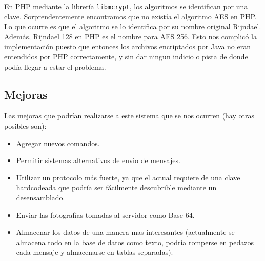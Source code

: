 En PHP mediante la librería \texttt{libmcrypt}, los algoritmos se identifican
por una clave. Sorprendentemente encontramos que no existía el algoritmo AES
en PHP. Lo que ocurre es que el algoritmo se lo identifica por su nombre original
Rijndael. Además, Rijndael 128 en PHP es el nombre para AES 256. Esto nos
complicó la implementación puesto que entonces los archivos encriptados por
Java no eran entendidos por PHP correctamente, y sin dar ningun indicio o pista
de donde podía llegar a estar el problema.

\subsection{Mejoras}

Las mejoras que podrían realizarse a este sistema que se nos ocurren (hay otras
posibles son):

\begin{itemize}
	\item Agregar nuevos comandos.
	\item Permitir sistemas alternativos de envio de mensajes.
	\item Utilizar un protocolo más fuerte, ya que el actual requiere de una
	clave hardcodeada que podría ser fácilmente descubrible mediante un
	desensamblado.
	\item Enviar las fotografías tomadas al servidor como Base 64.
	\item Almacenar los datos de una manera mas interesantes (actualmente se
	almacena todo en la base de datos como texto, podría romperse en pedazos
	cada mensaje y almacenarse en tablas separadas).
\end{itemize}

